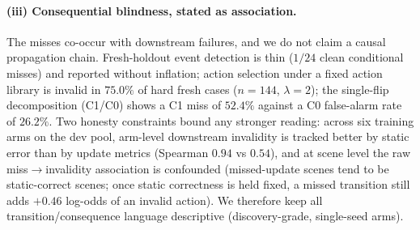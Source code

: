 \paragraph{(iii) Consequential blindness, stated as association.} The
misses co-occur with downstream failures, and we do not claim a causal
propagation chain. Fresh-holdout event detection is thin ($1/24$ clean
conditional misses) and reported without inflation; action selection under
a fixed action library is invalid in $75.0\%$ of hard fresh cases
($n{=}144$, $\lambda{=}2$); the single-flip decomposition (C1/C0) shows a
C1 miss of $52.4\%$ against a C0 false-alarm rate of $26.2\%$. Two
honesty constraints bound any stronger reading: across six training arms on
the dev pool, arm-level downstream invalidity is tracked better by static
error than by update metrics (Spearman $0.94$ vs $0.54$), and at scene
level the raw miss$\to$invalidity association is confounded (missed-update
scenes tend to be static-correct scenes; once static correctness is held
fixed, a missed transition still adds $+0.46$ log-odds of an invalid
action). We therefore keep all transition/consequence language descriptive
(discovery-grade, single-seed arms).
